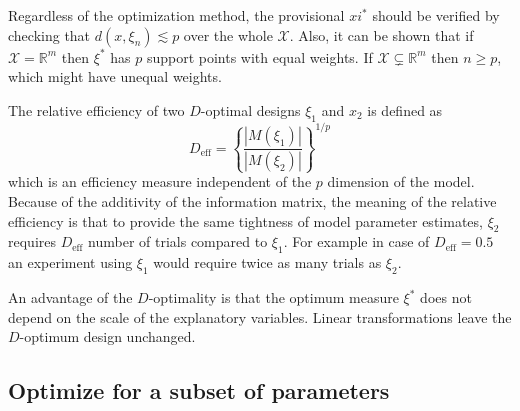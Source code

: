 \documentclass[12pt]{iopart}
\begin{document}
Regardless of the optimization method, the provisional $xi^*$ should be verified by checking that $d(x, \xi_{n}) \lesssim p$ over the whole $\mathcal{X}$. Also, it can be shown that if $\mathcal{X} = \mathbb{R}^m$ then $\xi^*$ has $p$ support points with equal weights. If $\mathcal{X} \subsetneq \mathbb{R}^m$ then $n \geq p$, which might have unequal weights.

The relative efficiency of two $D$-optimal designs $\xi_1$ and $x_2$ is defined as
\begin{equation}
D_\mathrm{eff} = \left\{\frac{|M(\xi_1)|}{|M(\xi_2)|}\right\}^{1/p}
\end{equation}
which is an efficiency measure independent of the $p$ dimension of the model. Because of the additivity of the information matrix, the meaning of the relative efficiency is that to provide the same tightness of model parameter estimates, $\xi_2$ requires $D_\mathrm{eff}$ number of trials compared to $\xi_1$. For example in case of $D_\mathrm{eff} = 0.5$ an experiment using $\xi_1$ would require twice as many trials as $\xi_2$.

An advantage of the $D$-optimality is that the optimum measure $\xi^*$ does not depend on the scale of the explanatory variables. Linear transformations leave the $D$-optimum design unchanged.


\subsection{Optimize for a subset of parameters}
\end{document}
